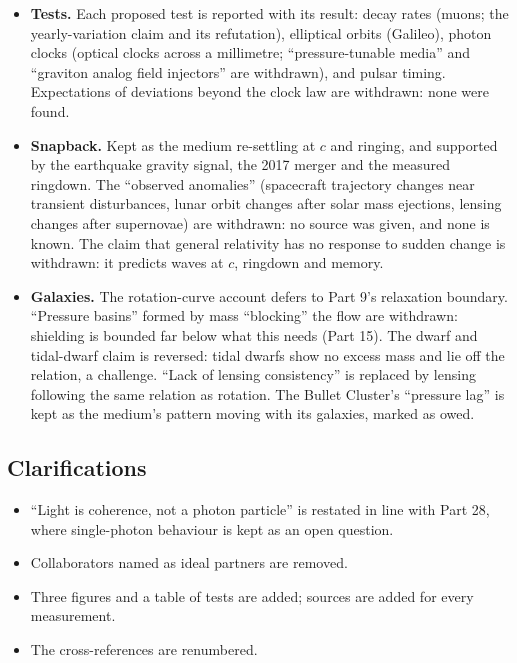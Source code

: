 \begin{itemize}
\item \textbf{Tests.} Each proposed test is reported with its result: decay rates (muons; the yearly-variation claim and its refutation), elliptical orbits (Galileo), photon clocks (optical clocks across a millimetre; ``pressure-tunable media'' and ``graviton analog field injectors'' are withdrawn), and pulsar timing. Expectations of deviations beyond the clock law are withdrawn: none were found.
\item \textbf{Snapback.} Kept as the medium re-settling at $c$ and ringing, and supported by the earthquake gravity signal, the 2017 merger and the measured ringdown. The ``observed anomalies'' (spacecraft trajectory changes near transient disturbances, lunar orbit changes after solar mass ejections, lensing changes after supernovae) are withdrawn: no source was given, and none is known. The claim that general relativity has no response to sudden change is withdrawn: it predicts waves at $c$, ringdown and memory.
\item \textbf{Galaxies.} The rotation-curve account defers to Part 9's relaxation boundary. ``Pressure basins'' formed by mass ``blocking'' the flow are withdrawn: shielding is bounded far below what this needs (Part 15). The dwarf and tidal-dwarf claim is reversed: tidal dwarfs show no excess mass and lie off the relation, a challenge. ``Lack of lensing consistency'' is replaced by lensing following the same relation as rotation. The Bullet Cluster's ``pressure lag'' is kept as the medium's pattern moving with its galaxies, marked as owed.
\end{itemize}

\subsection*{Clarifications}
\begin{itemize}
\item ``Light is coherence, not a photon particle'' is restated in line with Part 28, where single-photon behaviour is kept as an open question.
\item Collaborators named as ideal partners are removed.
\item Three figures and a table of tests are added; sources are added for every measurement.
\item The cross-references are renumbered.
\end{itemize}



